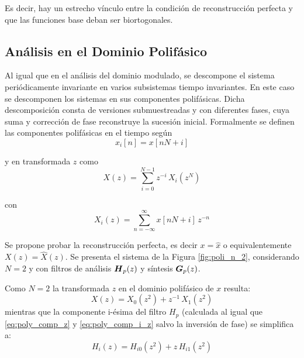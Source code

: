 	Es decir, hay un estrecho vínculo entre la condición de reconstrucción perfecta y que las funciones base deban ser biortogonales.

\subsection{Análisis en el Dominio Polifásico}

	Al igual que en el análisis del dominio modulado, se descompone el sistema periódicamente 
	invariante en varios subsistemas tiempo invariantes. En este caso se descomponen los sistemas en sus componentes polifásicas. 
	Dicha descomposición consta de versiones submuestreadas y con diferentes fases, cuya suma y corrección de fase reconstruye la sucesión inicial.
	Formalmente se definen las componentes polifásicas en el tiempo según
		\begin{equation}
			x_i[n] = x[nN+i]
			\label{eq:poly_comp}
		\end{equation}
		
		y en transformada $z$ como 
		\begin{equation} %
			X(z)= \sum^{N-1}_{i=0} z^{-i} \, X_i(z^N)
			\label{eq:poly_comp_z}
		\end{equation}
		
		con
		\begin{equation} %
			X_i(z)=\sum^{\infty}_{n=-\infty} x[nN+ i]\, z^{-n}
			\label{eq:poly_comp_i_z}
		\end{equation}

	Se propone probar la reconstrucción perfecta, es decir $x = \hat{x}$ o equivalentemente $X(z) = \hat{X}(z)$. Se presenta el sistema de la Figura \ref{fig:poli_n_2}, considerando $N=2$ y con filtros de análisis $\boldsymbol{H}_p(z)$ y síntesis $\boldsymbol{G}_p(z)$. 

	Como $N=2$ la transformada $z$ en el dominio polifásico de $x$ resulta:
		\begin{equation}
			X(z) = X_0 (z^2) + z^{-1}\, X_1 (z^2)
			\label{eq:xp_z}
		\end{equation}
	mientras que la componente i-ésima del filtro $H_p$ (calculada al igual que \eqref{eq:poly_comp_z} y \eqref{eq:poly_comp_i_z} salvo la inversión de fase) se simplifica a:
		\begin{equation}
			H_i(z) = H_{i0} (z^2) + z\, H_{i1} (z^2)
			\label{eq:hpi_z}
		\end{equation}

